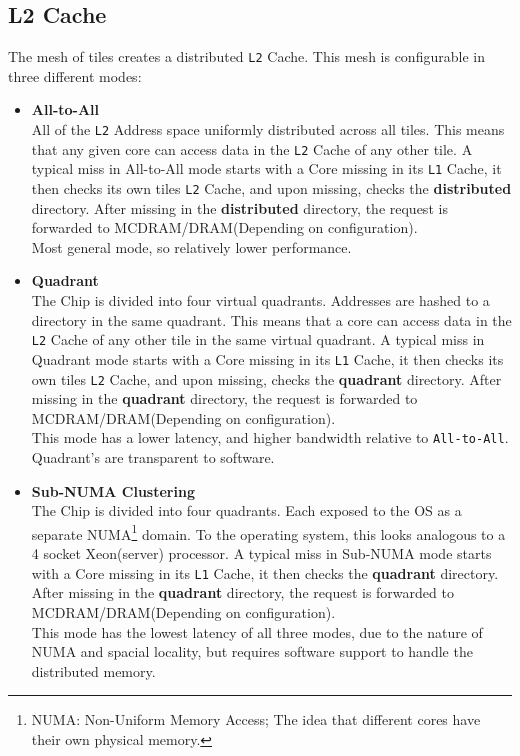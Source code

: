 \documentclass[bsc,frontabs,twoside,singlespacing,parskip,deptreport]{infthesis}     %
\begin{document}
\subsection{L2 Cache}
The mesh of tiles creates a distributed \texttt{L2} Cache. This mesh is configurable in three different modes:
\begin{itemize}

    \item \textbf{All-to-All} \\
    All of the \texttt{L2} Address space uniformly distributed across all tiles. This means that any given core can access data in the \texttt{L2} Cache of any other tile. A typical miss in All-to-All mode starts with a Core missing in its \texttt{L1} Cache, it then checks its own tiles \texttt{L2} Cache, and upon missing, checks the \textbf{distributed} directory. After missing in the \textbf{distributed} directory, the request is forwarded to MCDRAM/DRAM(Depending on configuration).\\
    Most general mode, so relatively lower performance.
    
    \item \textbf{Quadrant} \\
    The Chip is divided into four virtual quadrants. Addresses are hashed to a directory in the same quadrant. This means that a core can access data in the \texttt{L2} Cache of any other tile in the same virtual quadrant. A typical miss in Quadrant mode starts with a Core missing in its \texttt{L1} Cache, it then checks its own tiles \texttt{L2} Cache, and upon missing, checks the \textbf{quadrant} directory. After missing in the \textbf{quadrant} directory, the request is forwarded to MCDRAM/DRAM(Depending on configuration).\\
    This mode has a lower latency, and higher bandwidth relative to \texttt{All-to-All}. Quadrant's are transparent to software.
    
    \item \textbf{Sub-NUMA Clustering}\label{snc4-explained} \\
    The Chip is divided into four quadrants. Each exposed to the OS as a separate NUMA\footnote{NUMA: Non-Uniform Memory Access; The idea that different cores have their own physical memory.} domain. To the operating system, this looks analogous to a 4 socket Xeon(server) processor. A typical miss in Sub-NUMA mode starts with a Core missing in its \texttt{L1} Cache, it then checks the \textbf{quadrant} directory. After missing in the \textbf{quadrant} directory, the request is forwarded to MCDRAM/DRAM(Depending on configuration). \\
    This mode has the lowest latency of all three modes, due to the nature of NUMA and spacial locality, but requires software support to handle the distributed memory.
    
\end{itemize}
\end{document}
